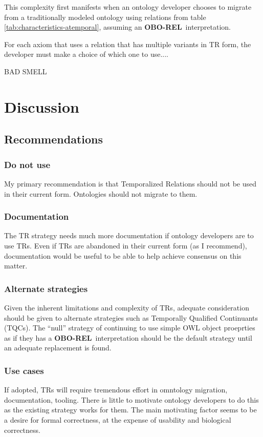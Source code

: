 \documentclass{bioinfo}
\def\OBOREL{\textbf{OBO-REL}}
\begin{document}
This complexity first manifests when an ontology developer chooses to
migrate from a traditionally modeled ontology using relations from
table \ref{tab:characteristics-atemporal}, assuming an \OBOREL\
interpretation.

For each axiom that uses a relation that has multiple variants in TR
form, the developer must make a choice of which one to use....

BAD SMELL

\section{Discussion}

\subsection{Recommendations}

\subsubsection{Do not use} My primary recommendation is that
Temporalized Relations should not be used in their current
form. Ontologies should not migrate to them.

\subsubsection{Documentation} The TR strategy needs much more
documentation if ontology developers are to use TRs. Even if TRs are
abandoned in their current form (as I recommend), documentation would
be useful to be able to help achieve consensus on this matter.

\subsubsection{Alternate strategies} Given the inherent limitations
and complexity of TRs, adequate consideration should be given to
alternate strategies such as Temporally Qualified Continuants
(TQCs). The ``null'' strategy of continuing to use simple OWL object
proeprties as if they has a \OBOREL\ interpretation should be the
default strategy until an adequate replacement is found.

\subsubsection{Use cases} If adopted, TRs will require tremendous
effort in omntology migration, documentation, tooling. There is little
to motivate ontology developers to do this as the existing strategy
works for them. The main motivating factor seems to be a desire for
formal correctness, at the expense of usability and biological
correctness.
\end{document}
